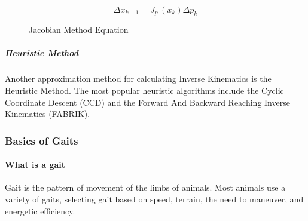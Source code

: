                 \begin{figure}
                    \centering
                    $$\Delta x_{k+1} = J_p^+ (x_k)\Delta p_k 
                    $$
                    \caption{Jacobian Method Equation}
                    \label{fig:ikin_jacobian}
                \end{figure}
            \subparagraph*{Heuristic Method}
                Another approximation method for calculating Inverse Kinematics is the Heuristic Method. The most popular heuristic algorithms include the Cyclic Coordinate Descent (CCD) \cite{ikin_CCD} and the Forward And Backward Reaching Inverse Kinematics (FABRIK). \cite{ikin_FABRIK}
                


        \subsubsection{Basics of Gaits}
            \paragraph*{What is a gait}
            Gait is the pattern of movement of the limbs of animals. Most animals use a variety of gaits, selecting gait based on speed, terrain, the need to maneuver, and energetic efficiency. \cite{wikipedia_2018_Gaits} 

